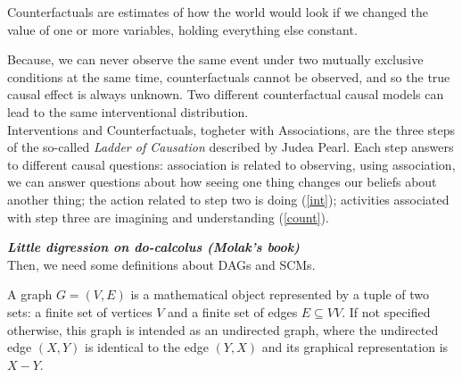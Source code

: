 \begin{definition}[Counterfactual]\label{count}
    Counterfactuals are estimates of how the world would look if we changed the value of one or more variables, holding everything else constant.
\end{definition}

Because, we can never observe the same event under two mutually exclusive conditions at the same time, counterfactuals cannot be observed, and so the true causal effect is always unknown. Two different counterfactual causal models can lead to the same interventional distribution.\\

Interventions and Counterfactuals, togheter with Associations, are the three steps of the so-called \textit{Ladder of Causation} described by Judea Pearl.
Each step answers to different causal questions:  association is related to observing, using association, we can answer questions about how seeing one thing changes our beliefs about another thing;  the action related to step two is doing (\ref{int}); activities associated with step three are imagining and understanding (\ref{count}).\\


\begin{definition}[do-operator]\label{doo}
    
\end{definition}

\textit{\textbf{Little digression on do-calcolus (Molak's book)}}\\

Then, we need some definitions about DAGs and SCMs.\\

\begin{definition}[Graph]
    A graph $G = (V, E)$ is a mathematical object represented by a tuple of two sets: a finite set of vertices $V$ and a finite set of edges $E \subseteq VV$. If not specified otherwise, this graph is intended as an undirected graph, where the undirected edge $(X, Y)$ is identical to the edge $(Y, X)$ and its graphical representation is $X - Y$.
\end{definition}

